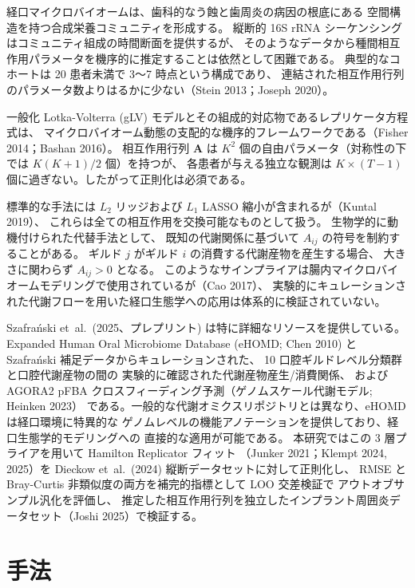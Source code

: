 \documentclass[11pt,a4paper]{article}
\newcommand{\bA}{\mathbf{A}}
\begin{document}
経口マイクロバイオームは、歯科的なう蝕と歯周炎の病因の根底にある
空間構造を持つ合成栄養コミュニティを形成する。
縦断的 16S rRNA シーケンシングはコミュニティ組成の時間断面を提供するが、
そのようなデータから種間相互作用パラメータを機序的に推定することは依然として困難である。
典型的なコホートは 20 患者未満で 3～7 時点という構成であり、
連結された相互作用行列のパラメータ数よりはるかに少ない（Stein 2013；Joseph 2020）。

一般化 Lotka-Volterra (gLV) モデルとその組成的対応物であるレプリケータ方程式は、
マイクロバイオーム動態の支配的な機序的フレームワークである（Fisher 2014；Bashan 2016）。
相互作用行列 $\bA$ は $K^2$ 個の自由パラメータ（対称性の下では $K(K+1)/2$ 個）を持つが、
各患者が与える独立な観測は $K \times (T-1)$ 個に過ぎない。したがって正則化は必須である。

標準的な手法には $L_2$ リッジおよび $L_1$ LASSO 縮小が含まれるが（Kuntal 2019）、
これらは全ての相互作用を交換可能なものとして扱う。
生物学的に動機付けられた代替手法として、
既知の代謝関係に基づいて $A_{ij}$ の符号を制約することがある。
ギルド $j$ がギルド $i$ の消費する代謝産物を産生する場合、
大きさに関わらず $A_{ij} > 0$ となる。
このようなサインプライアは腸内マイクロバイオームモデリングで使用されているが（Cao 2017）、
実験的にキュレーションされた代謝フローを用いた経口生態学への応用は体系的に検証されていない。

Szafra\'{n}ski et~al.~(2025、プレプリント) は特に詳細なリソースを提供している。
Expanded Human Oral Microbiome Database (eHOMD; Chen 2010) と
Szafra\'{n}ski 補足データからキュレーションされた、
10 口腔ギルドレベル分類群と口腔代謝産物の間の
実験的に確認された代謝産物産生/消費関係、
および AGORA2 pFBA クロスフィーディング予測（ゲノムスケール代謝モデル; Heinken 2023）
である。一般的な代謝オミクスリポジトリとは異なり、eHOMD は経口環境に特異的な
ゲノムレベルの機能アノテーションを提供しており、経口生態学的モデリングへの
直接的な適用が可能である。
本研究ではこの 3 層プライアを用いて Hamilton Replicator フィット
（Junker 2021；Klempt 2024, 2025）を Dieckow et~al.~(2024) 縦断データセットに対して正則化し、
RMSE と Bray-Curtis 非類似度の両方を補完的指標として LOO 交差検証で
アウトオブサンプル汎化を評価し、
推定した相互作用行列を独立したインプラント周囲炎データセット（Joshi 2025）で検証する。

\section{手法}
\label{sec:methods}
\end{document}
